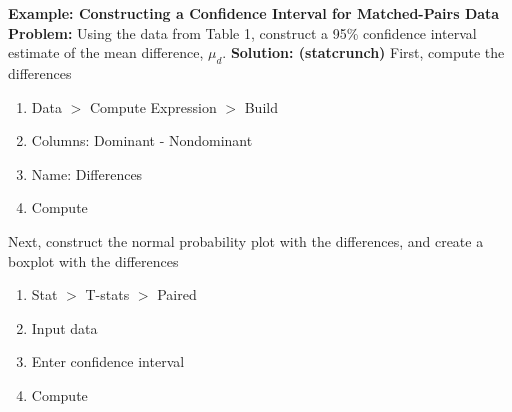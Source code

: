 \documentclass{report}
\begin{document}
    \begin{mdframed}
      \textbf{Example: Constructing a Confidence Interval for Matched-Pairs Data}
      \bigbreak \noindent 
      \textbf{Problem:}
      Using the data from Table 1, construct a 95\% confidence interval estimate of the mean difference, $\mu_{d}$.
        \bigbreak \noindent 
        \textbf{Solution: (statcrunch)}
        \bigbreak \noindent 
        First, compute the differences
        \begin{enumerate}
            \item Data $> $ Compute Expression $> $ Build
            \item Columns: Dominant - Nondominant
            \item Name: Differences
            \item Compute
        \end{enumerate}
        \bigbreak \noindent 
        Next, construct the normal probability plot with the differences, and create a boxplot with the differences
        \bigbreak \noindent 
        \begin{enumerate}
            \item Stat $> $ T-stats $> $ Paired 
            \item Input data
            \item Enter confidence interval
            \item Compute
        \end{enumerate}
    \end{mdframed}

    \pagebreak \bigbreak \noindent 
\end{document}
